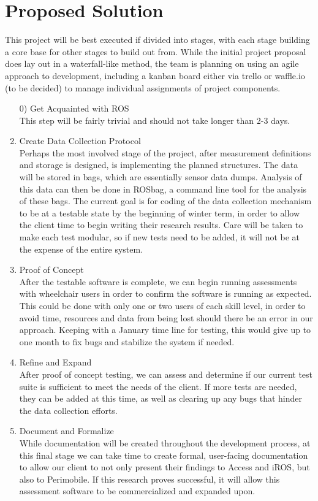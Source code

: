 \documentclass[onecolumn, draftclsnofoot,10pt, compsoc]{IEEEtran}
\begin{document}
\section{Proposed Solution}
This project will be best executed if divided into stages, with each stage building a core base for other stages to build out from. While the initial project proposal does lay out in a waterfall-like method, the team is planning on using an agile approach to development, including a kanban board either via trello or waffle.io (to be decided) to manage individual assignments of project components.\\
\begin{enumerate}
	\item [0)]\setcounter{enumi}{0} \large{Get Acquainted with ROS}\\
	\normalsize This step will be fairly trivial and should not take longer than 2-3 days.
	\item \large{Create Data Collection Protocol }\\
	\normalsize Perhaps the most involved stage of the project, after measurement definitions and storage is designed, is implementing the planned structures. The data will be stored in bags, which are essentially sensor data dumps. Analysis of this data can then be done in ROSbag, a command line tool for the analysis of these bags. The current goal is for coding of the data collection mechanism to be at a testable state by the beginning of winter term, in order to allow the client time to begin writing their research results. Care will be taken to make each test modular, so if new tests need to be added, it will not be at the expense of the entire system.
	\item \large{Proof of Concept}\\
	\normalsize After the testable software is complete, we can begin running assessments with wheelchair users in order to confirm the software is running as expected. This could be done with only one or two users of each skill level, in order to avoid time, resources and data from being lost should there be an error in our approach. Keeping with a January time line for testing, this would give up to one month to fix bugs and stabilize the system if needed. 
	\item \large{Refine and Expand}\\
	\normalsize After proof of concept testing, we can assess and determine if our current test suite is sufficient to meet the needs of the client. If more tests are needed, they can be added at this time, as well as clearing up any bugs that hinder the data collection efforts. 
	\item \large {Document and Formalize}\\
	\normalsize While documentation will be created throughout the development process, at this final stage we can take time to create formal, user-facing documentation to allow our client to not only present their findings to Access and iROS, but also to Perimobile. If this research proves successful, it will allow this assessment software to be commercialized and expanded upon.
\end{enumerate}
\end{document}

